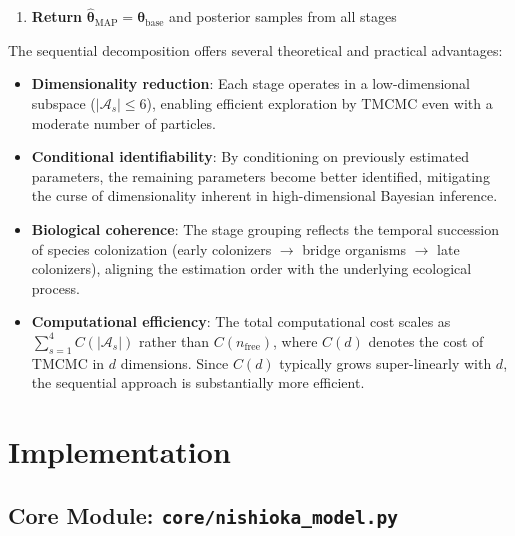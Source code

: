 \documentclass[11pt,a4paper]{article}
\begin{document}
\begin{algorithm}[htbp]
{\begin{minipage}{0.92\textwidth}
\begin{enumerate}
\begin{enumerate}
    \end{enumerate}
    \item[\textbf{3.}] \textbf{Return} $\hat{\boldsymbol{\theta}}_{\mathrm{MAP}} = \boldsymbol{\theta}_{\mathrm{base}}$ and posterior samples from all stages
\end{enumerate}
\vspace{0.2cm}
\end{minipage}}
\caption{Sequential estimation algorithm. Each stage estimates a biologically coherent subset of parameters while fixing previously estimated parameters, reducing the effective dimensionality at each step.}
\label{alg:sequential}
\end{algorithm}

The sequential decomposition offers several theoretical and practical advantages:
\begin{itemize}
    \item \textbf{Dimensionality reduction}: Each stage operates in a low-dimensional subspace ($|\mathcal{A}_s| \leq 6$), enabling efficient exploration by TMCMC even with a moderate number of particles.
    \item \textbf{Conditional identifiability}: By conditioning on previously estimated parameters, the remaining parameters become better identified, mitigating the curse of dimensionality inherent in high-dimensional Bayesian inference.
    \item \textbf{Biological coherence}: The stage grouping reflects the temporal succession of species colonization (early colonizers $\to$ bridge organisms $\to$ late colonizers), aligning the estimation order with the underlying ecological process.
    \item \textbf{Computational efficiency}: The total computational cost scales as $\sum_{s=1}^{4} C(|\mathcal{A}_s|)$ rather than $C(n_{\mathrm{free}})$, where $C(d)$ denotes the cost of TMCMC in $d$ dimensions. Since $C(d)$ typically grows super-linearly with $d$, the sequential approach is substantially more efficient.
\end{itemize}

\section{Implementation}

\subsection{Core Module: \texttt{core/nishioka\_model.py}}
\end{document}
